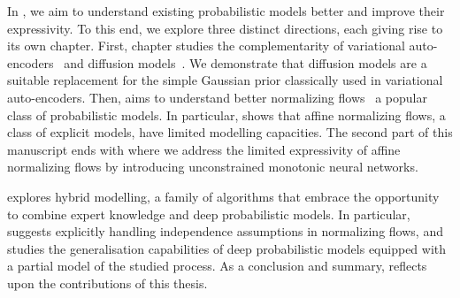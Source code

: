  In , we aim to understand existing probabilistic models better and improve their expressivity. To this end, we explore three distinct directions, each giving rise to its own chapter. First,  chapter studies the complementarity of variational auto-encoders~\citep{kingma_auto-encoding_2013} and diffusion models~\citep{sohl-dickstein_deep_2015, ho_denoising_2020, song_generative_2019}. We demonstrate that diffusion models are a suitable replacement for the simple Gaussian prior classically used in variational auto-encoders. Then,  aims to understand better normalizing flows~\citep[][NFs]{tabak2010density, tabak2013family, rezende2015variational} a popular class of probabilistic models. In particular,  shows that affine normalizing flows, a class of explicit models, have limited modelling capacities. The second part of this manuscript ends with  where we address the limited expressivity of affine normalizing flows by introducing unconstrained monotonic neural networks.

  explores hybrid modelling, a family of algorithms that embrace the opportunity to combine expert knowledge and deep probabilistic models. In particular,  suggests explicitly handling independence assumptions in normalizing flows, and  studies the generalisation capabilities of deep probabilistic models equipped with a partial model of the studied process. As a conclusion and summary,  reflects upon the contributions of this thesis.




